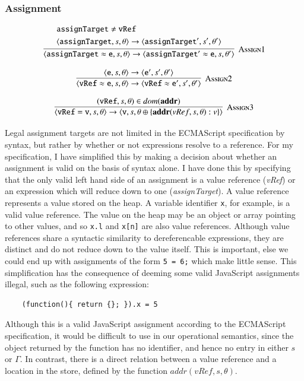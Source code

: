 \documentclass[12pt,a4paper,twoside,openright]{report}
\theoremstyle{definition}
\theoremstyle{dotless}
\newcommand*{\js}{\texttt}
\begin{document}
\subsubsection*{Assignment}

$$\infer[\textsc{Assign1}]
{
  \langle \mathtt{assignTarget \approx e}, s, \theta \rangle \rightarrow
  \langle \mathtt{assignTarget' \approx e}, s, \theta' \rangle
}
{
  \begin{split}
  	&\mathtt{assignTarget} \not = \mathtt{vRef} \\
  	&\langle \mathtt{assignTarget}, s, \theta \rangle \rightarrow
	\langle \mathtt{assignTarget'}, s', \theta'\rangle
  \end{split}
}$$

$$\infer[\textsc{Assign2}]
{
  \langle\mathtt{vRef\approx e},s,\theta\rangle\rightarrow
  \langle\mathtt{vRef\approx e'},s',\theta'\rangle
}{
  \langle\mathtt{e},s, \theta\rangle\rightarrow
  \langle\mathtt{e'}, s', \theta'\rangle
}$$

$$\infer[\textsc{Assign3}]
{
  \langle \mathtt{vRef = v}, s, \theta \rangle \rightarrow
  \langle \mathtt{v}, s, \theta\oplus\{\textbf{addr}(vRef, s, \theta) : v\} \rangle
}
{
  (\texttt{vRef}, s, \theta) \in dom(\textbf{addr})
}$$

Legal assignment targets are not limited in the ECMAScript specification by
syntax, but rather by whether or not expressions resolve to a reference. For my
specification, I have simplified this by making a decision about whether
an assignment is valid on the basis of syntax alone. I have done this by
specifying that the only valid left hand side of an assignment is a value
reference (\textit{vRef}) or an expression which will reduce down to one
(\textit{assignTarget}). A value reference represents a value stored
on the heap. A variable identifier \js{x}, for example, is a valid value
reference. The value on the heap may be an object or array pointing to other
values, and so \js{x.l} and \js{x[n]} are also value references. Although value
references share a syntactic similarity to dereferencable expressions, they are
distinct and do not reduce down to the value itself. This is important, else we
could end up with assignments of the form \js{5 = 6;} which make little sense.
This simplification has the consequence of deeming some valid JavaScript
assignments illegal, such as the following expression:
\begin{program}[H]
  \begin{verbatim}
	(function(){ return {}; }).x = 5
  \end{verbatim}
\end{program}
Although this is a valid JavaScript assignment according to the ECMAScript
specification, it would be difficult to use in our operational semantics, since
the object returned by the function has no identifier, and hence no entry in
either $s$ or $\Gamma$. In contrast, there is a direct relation between a value
reference and a location in the store, defined by the function 
$addr(vRef, s, \theta)$.
\end{document}

